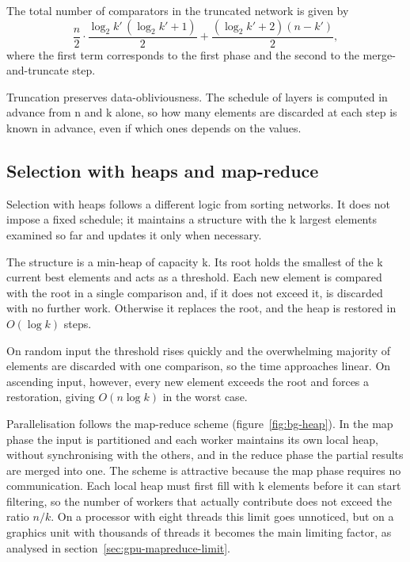The total number of comparators in the truncated network is given by
\[
	\frac{n}{2} \cdot \frac{\log_2 k' \, (\log_2 k' + 1)}{2}
	+ \frac{(\log_2 k' + 2)(n - k')}{2},
\]
where the first term corresponds to the first phase and the second to the
merge-and-truncate step.

Truncation preserves data-obliviousness. The schedule of layers is computed in
advance from n and k alone, so how many elements are discarded at each step is
known in advance, even if which ones depends on the values.



\subsection{Selection with heaps and map-reduce}
\label{sec:bg-mapreduce}

Selection with heaps follows a different logic from sorting networks. It does
not impose a fixed schedule; it maintains a structure with the k largest
elements examined so far and updates it only when necessary.

The structure is a min-heap of capacity k. Its root holds the smallest of the k
current best elements and acts as a threshold. Each new element is compared
with the root in a single comparison and, if it does not exceed it, is
discarded with no further work. Otherwise it replaces the root, and the heap is
restored in $O(\log k)$ steps.

On random input the threshold rises quickly and the overwhelming majority of
elements are discarded with one comparison, so the time approaches linear. On
ascending input, however, every new element exceeds the root and forces a
restoration, giving $O(n \log k)$ in the worst case.

Parallelisation follows the map-reduce scheme (figure~\ref{fig:bg-heap}). In
the map phase the input is partitioned and each worker maintains its own local
heap, without synchronising with the others, and in the reduce phase the
partial results are merged into one. The scheme is attractive because the map
phase requires no communication. Each local heap must first fill with k
elements before it can start filtering, so the number of workers that actually
contribute does not exceed the ratio $n/k$. On a processor with eight threads
this limit goes unnoticed, but on a graphics unit with thousands of threads it
becomes the main limiting factor, as analysed in
section~\ref{sec:gpu-mapreduce-limit}.

